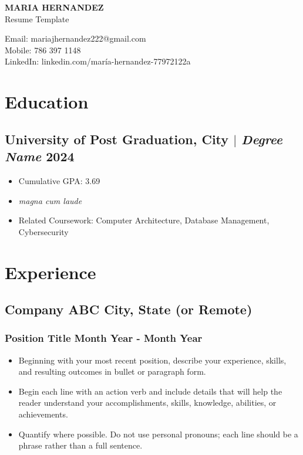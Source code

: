 \documentclass[11pt]{article} %
\begin{document}
\begin{center}
	\begin{minipage}{0.5\textwidth}
		{\Huge\bfseries
			MARIA HERNANDEZ %
		} \\ \medskip
		Resume Template %
	\end{minipage} \hfill
	\begin{minipage}{0.4\textwidth}
		\raggedleft
		Email: mariajhernandez222@gmail.com \\
		Mobile: 786 397 1148 \\
		LinkedIn: linkedin.com/maría-hernandez-77972122a \\
	\end{minipage}
\end{center}

\section{Education}
\subsection{University of Post Graduation, City $|$ {\normalfont\itshape Degree Name} \hfill 2024}
\begin{itemize}
	\item Cumulative GPA: 3.69
	\item \textit{magna cum laude} 
  \item Related Coursework: Computer Architecture, Database Management, Cybersecurity
\end{itemize}

\section{Experience}
\subsection{Company ABC \hfill City, State (or Remote)}
\subsubsection{Position Title \hfill  Month Year - Month Year}
\begin{itemize}
	\item Beginning with your most recent position, describe your experience, skills, and resulting outcomes in bullet or paragraph form.
	\item Begin each line with an action verb and include details that will help the reader understand your accomplishments, skills, knowledge, abilities, or achievements.
	\item Quantify where possible. Do not use personal pronouns; each line should be a phrase rather than a full sentence.
\end{itemize}
\end{document}
